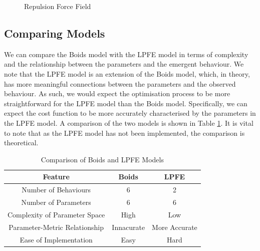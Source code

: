 \documentclass[12pt]{article}
\begin{document}
\begin{figure}[ht]
    \centering
{}
    \caption{Repulsion Force Field}
    \label{fig:force-field-rep}
\end{figure}

\subsection{Comparing Models}
We can compare the Boids model with the LPFE model in terms of complexity and the relationship between the parameters and the emergent behaviour. We note that the LPFE model is an extension of the Boids model, which, in theory, has more meaningful connections between the parameters and the observed behaviour. As such, we would expect the optimisation process to be more straightforward for the LPFE model than the Boids model. Specifically, we can expect the cost function to be more accurately characterised by the parameters in the LPFE model. A comparison of the two models is shown in Table \ref{tab:model-comparison}. It is vital to note that as the LPFE model has not been implemented, the comparison is theoretical.

\begin{table}[ht]
    \centering
    \begin{tabular}{|c|c|c|}
        \hline
       Feature & Boids & LPFE \\
        \hline\hline
        Number of Behaviours & 6 & 2 \\
        \hline
        Number of Parameters & 6 & 6 \\
        \hline
        Complexity of Parameter Space & High & Low \\
        \hline
        Parameter-Metric Relationship & Innacurate & More Accurate \\
        \hline
        Ease of Implementation & Easy & Hard \\
        \hline
    \end{tabular}
    \caption{Comparison of Boids and LPFE Models}
    \label{tab:model-comparison}
\end{table}
\end{document}
